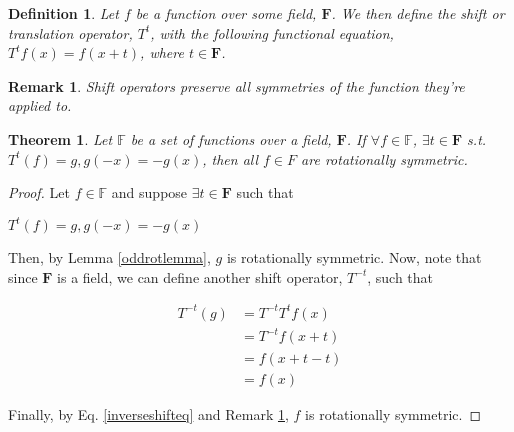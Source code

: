\documentclass{article}
\newtheorem{definition}{Definition}
\newtheorem{remark}{Remark}
\newtheorem{theorem}{Theorem}
\begin{document}
\begin{definition}\label{shiftdef}
  Let $f$ be a function over some field, $\mathbf{F}$. We then define the shift or
  translation operator, $T^t$, with the following functional equation,
  $T^t f(x) = f(x+t)$, where $t \in \mathbf{F}$.
\end{definition}

\begin{remark}\label{shiftsymremark}
  Shift operators preserve all symmetries of the function they're applied to.
\end{remark}

\begin{theorem}
  Let $\mathbb{F}$ be a set of functions over a field, $\mathbf{F}$. If $\forall f\in \mathbb{F}$, $\exists t \in \mathbf{F}$
  s.t. $T^t(f) = g, g(-x) = -g(x)$, then all $f \in F$ are rotationally symmetric.
\end{theorem}

\begin{proof}
  Let $f \in \mathbb{F}$ and suppose $\exists t \in \mathbf{F}$ such that

  \begin{center}
    $T^t(f) = g, g(-x) = -g(x)$
  \end{center}

  Then, by Lemma \ref{oddrotlemma}, $g$ is rotationally symmetric. Now, note that since $\mathbf{F}$ is a field,
  we can define another shift operator, $T^{-t}$, such that

  \begin{center}
    \begin{equation}\label{inverseshifteq}
      \begin{split}
        T^{-t}(g)
        &= T^{-t} T^t f(x) \\
        &= T^{-t} f(x+t) \\
        &= f(x+t-t) \\
        &= f(x)
      \end{split}
    \end{equation}
  \end{center}

  Finally, by Eq. \ref{inverseshifteq} and Remark \ref{shiftsymremark}, $f$ is rotationally symmetric.
\end{proof}
\end{document}
